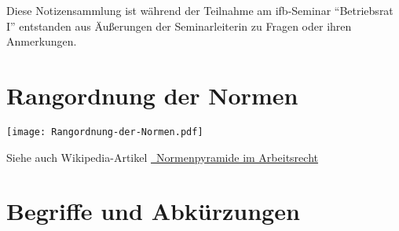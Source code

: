 \documentclass[version=last,paper=A4,fontsize=11pt,DIV=18]{scrartcl}
\begin{document}
Diese Notizensammlung ist während der Teilnahme am ifb-Seminar \enquote{Betriebsrat I} entstanden aus Äußerungen der Seminarleiterin zu Fragen oder ihren Anmerkungen.

\section*{Rangordnung der Normen}

\begin{center}
	\texttt{[image: Rangordnung-der-Normen.pdf]}
\end{center}

Siehe auch Wikipedia-Artikel \href{https://de.wikipedia.org/wiki/Normenpyramide_im_Arbeitsrecht}{~Normenpyramide im Arbeitsrecht}

\section*{Begriffe und Abkürzungen}
\end{document}
